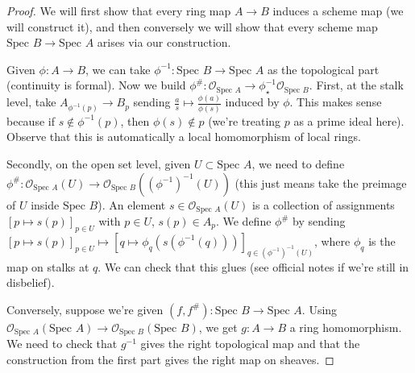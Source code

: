 \documentclass{article}
\theoremstyle{definition}
\begin{document}
\begin{proof}
    We will first show that every ring map $A \to B$ induces a scheme map (we will construct it), and then conversely we will show that every scheme map $\text{Spec }B \to \text{Spec }A$ arises via our construction.
    \vspace{1mm}
     
    Given $\phi : A \to B$, we can take $\phi^{-1} : \text{Spec }B \to \text{Spec }A$ as the topological part (continuity is formal). Now we build $\phi^\# : \mathcal{O}_{\text{Spec }A} \to \phi^{-1}_{\star}\mathcal{O}_{\text{Spec }B}$. First, at the stalk level, take $A_{\phi^{-1}(p)} \to B_p$ sending $\frac{a}{s} \mapsto \frac{\phi(a)}{\phi(s)}$ induced by $\phi$. This makes sense because if $s \not\in \phi^{-1}(p)$, then $\phi(s) \not\in p$ (we're treating $p$ as a prime ideal here). Observe that this is automatically a local homomorphism of local rings.
    \vspace{1mm}
     
    Secondly, on the open set level, given $U \subset \text{Spec }A$, we need to define $\phi^\# : \mathcal{O}_{\text{Spec }A}(U) \to \mathcal{O}_{\text{Spec }B}((\phi^{-1})^{-1}(U))$ (this just means take the preimage of $U$ inside $\text{Spec } B$). An element $s \in \mathcal{O}_{\text{Spec }A}(U)$ is a collection of assignments $[p \mapsto s(p)]_{p \in U}$ with $p \in U$, $s(p) \in A_p$. We define $\phi^\#$ by sending $[p \mapsto s(p)]_{p \in U} \mapsto [q \mapsto \phi_q(s(\phi^{-1}(q)))]_{q \in (\phi^{-1})^{-1}(U)}$, where $\phi_q$ is the map on stalks at $q$. We can check that this glues (see official notes if we're still in disbelief).
    \vspace{1mm}
     
    Conversely, suppose we're given $(f,f^\#) \colon \text{Spec }B \to \text{Spec }A$. Using $\mathcal{O}_{\text{Spec }A}(\text{Spec }A) \to \mathcal{O}_{\text{Spec }B}(\text{Spec }B)$, we get $g: A \to B$ a ring homomorphism. We need to check that $g^{-1}$ gives the right topological map and that the construction from the first part gives the right map on sheaves.
    \vspace{1mm}
     

\end{proof}
\end{document}
